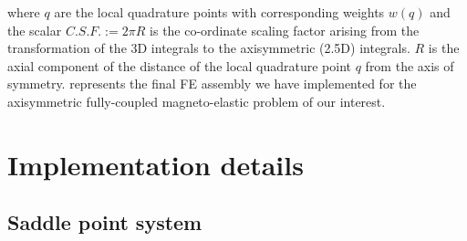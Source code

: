 where $q$ are the local quadrature points with corresponding weights $w(q)$ and the scalar $C.S.F. := 2 \pi R$ is the co-ordinate scaling factor arising from the transformation of the 3D integrals to the axisymmetric (2.5D) integrals. $R$ is the axial component of the distance of the local quadrature point $q$ from the axis of symmetry.  represents the final FE assembly we have implemented for the axisymmetric fully-coupled magneto-elastic problem of our interest. \par 

\section{Implementation details}

\subsection{Saddle point system}

